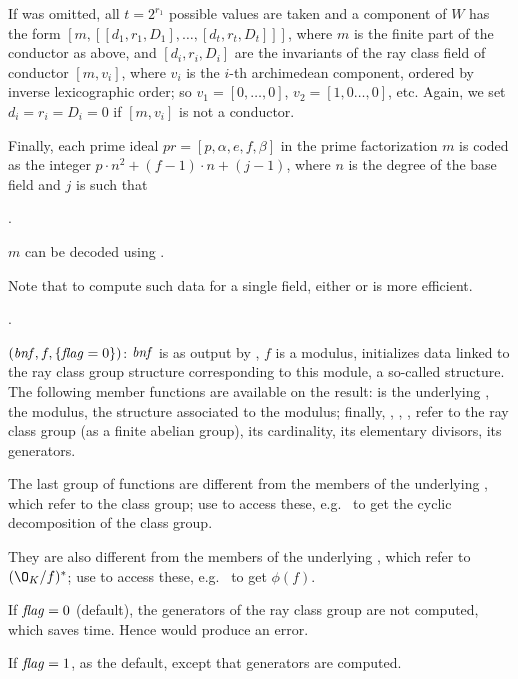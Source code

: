 If  was omitted, all $t = 2^{r_1}$ possible values are taken and a
component of $W$ has the form $[m, [[d_1,r_1,D_1], \dots, [d_t,r_t,D_t]]]$,
where $m$ is the finite part of the conductor as above, and
$[d_i,r_i,D_i]$ are the invariants of the ray class field of conductor
$[m,v_i]$, where $v_i$ is the $i$-th archimedean component, ordered by
inverse lexicographic order; so $v_1 = [0,\dots,0]$, $v_2 = [1,0\dots,0]$,
etc. Again, we set $d_i = r_i = D_i = 0$ if $[m,v_i]$ is not a conductor.

Finally, each prime ideal $pr = [p,\alpha,e,f,\beta]$ in the prime
factorization $m$ is coded as the integer $p\cdot n^2+(f-1)\cdot n+(j-1)$,
where $n$ is the degree of the base field and $j$ is such that

.

\noindent $m$ can be decoded using .


Note that to compute such data for a single field, either 
or  is more efficient.

.

$(\hbox{\it bnf\/},f,\{\hbox{\it f\kern0pt lag\/}=0\})$: $\hbox{\it bnf\/}$ is as
output by , $f$ is a modulus, initializes data linked to
the ray class group structure corresponding to this module, a so-called
 structure. The following member functions are available
on the result:  is the underlying ,
 the modulus,  the  structure associated to the
modulus; finally, , , ,  refer to the
ray class group (as a finite abelian group), its cardinality, its elementary
divisors, its generators. 

The last group of functions are different from the members of the underlying
, which refer to the class group; use 
to access these, e.g.~ to get the cyclic decomposition
of the class group.

They are also different from the members of the underlying , which
refer to $(\O_K/f)^*$; use  to access these,
e.g.~ to get $\phi(f)$.

If $\hbox{\it f\kern0pt lag\/}=0$ (default), the generators of the ray class group are not computed,
which saves time. Hence  would produce an error.

If $\hbox{\it f\kern0pt lag\/}=1$, as the default, except that generators are computed.

